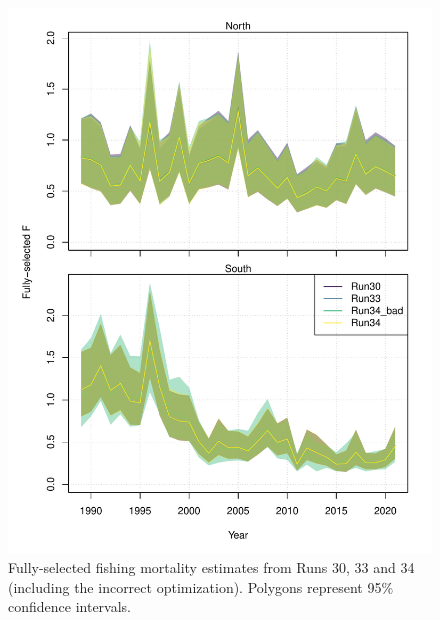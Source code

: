 \documentclass[
]{article}
\begin{document}
\begin{figure}

{\centering \includegraphics{bsb_models_wp_files/figure-latex/F-compare-1} 

}

\caption{Fully-selected fishing mortality estimates from Runs 30, 33 and 34 (including the incorrect optimization). Polygons represent 95\% confidence intervals.}\label{fig:F-compare}
\end{figure}
\end{document}
